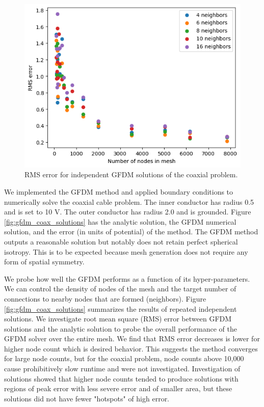 \documentclass{PoS}
\begin{document}
\begin{figure}
    \centering
    \includegraphics[width=\linewidth]{Figures/GFDM/Coax_GFDM_Nodes_Neighbors_RMS.png}
    \caption{RMS error for independent GFDM solutions of the coaxial problem.}
    \label{fig:gfdm_coax_nodes_neighbors}
\end{figure}
We implemented the GFDM method and applied boundary conditions to numerically solve the coaxial cable problem. The inner conductor has radius 0.5 and is set to 10 V. The outer conductor has radius 2.0 and is grounded. Figure \ref{fig:gfdm_coax_solutions} has the analytic solution, the GFDM numerical solution, and the error (in units of potential) of the method. The GFDM method outputs a reasonable solution but notably does not retain perfect spherical isotropy. This is to be expected because mesh generation does not require any form of spatial symmetry.

We probe how well the GFDM performs as a function of its hyper-parameters. We can control the density of nodes of the mesh and the target number of connections to nearby nodes that are formed (neighbors). Figure \ref{fig:gfdm_coax_solutions} summarizes the results of repeated independent solutions. We investigate root mean square (RMS) error between GFDM solutions and the analytic solution to probe the overall performance of the GFDM solver over the entire mesh. We find that RMS error decreases is lower for higher node count which is desired behavior. This suggests the method converges for large node counts, but for the coaxial problem, node counts above 10,000 cause prohibitively slow runtime and were not investigated. Investigation of solutions showed that higher node counts tended to produce solutions with regions of peak error with less severe error and of smaller area, but these solutions did not have fewer "hotspots" of high error.
\end{document}

